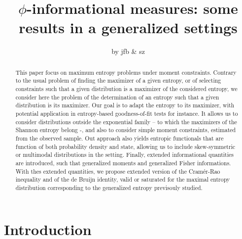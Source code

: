\documentclass[english,sort&compress]{elsarticle}
\theoremstyle{definition}
\theoremstyle{plain}
\theoremstyle{plain}
\begin{document}

\title{$\phi$-informational  measures:  some results in a generalized  settings}
%
\author{by jfb \& sz \date{} }
\begin{abstract}
   This
  paper focus on maximum entropy  problems under moment constraints. Contrary to
  the usual problem of finding the maximizer of a given entropy, or of selecting
  constraints such  that a given distribution  is a maximizer of  the considered
  entropy, we consider here the problem  of the determination of an entropy such
  that a given distribution  is its maximizer. Our goal is  to adapt the entropy
  to its maximizer, with  potential application in entropy-based goodness-of-fit
  tests  for  instance. It  allows  us  to  consider distributions  outside  the
  exponential family – to which the  maximizers of the Shannon entropy belong -,
  and also  to consider simple  moment constraints, estimated from  the observed
  sample. Out  approach also  yields entropic functionals  that are  function of
  both probability density  and state, allowing us to  include skew-symmetric or
  multimodal  distributions  in  the setting.  Finally,  extended  informational
  quantities  are  introduced, such  that  generalized  moments and  generalized
  Fisher  informations.   With thes  extended  quantities,  we propose  extended
  version of the Cram\'er-Rao inequality and of the de Bruijn identity, valid or
  saturated  for   the  maximal   entropy  distribution  corresponding   to  the
  generalized entropy previsouly studied.
\end{abstract}

\maketitle



\section{Introduction}
\label{sec:Intro}
\end{document}

